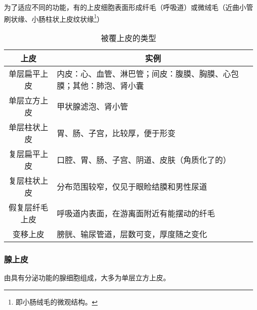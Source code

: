 为了适应不同的功能，有的上皮细胞表面形成纤毛（呼吸道）或微绒毛（近曲小管刷状缘、小肠柱状上皮纹状缘\footnote{即小肠绒毛的微观结构。}）

\begin{table}[h!]
	\centering
	\begin{tabularx}{\textwidth}{|c|X|}
		\hline
		上皮 & \multicolumn{1}{c|}{实例} \\ \hline
		单层扁平上皮 & 内皮：\hspace{-0.5em}心\hspace{-0.25em}、\hspace{-0.5em}血管\hspace{-0.25em}、\hspace{-0.5em}淋巴管；\hspace{-0.5em}间皮：\hspace{-0.5em}腹膜\hspace{-0.25em}、\hspace{-0.5em}胸膜\hspace{-0.25em}、\hspace{-0.5em}心包膜；\hspace{-0.5em}其他：\hspace{-0.5em}肺泡\hspace{-0.25em}、\hspace{-0.5em}肾小囊 \\ \hline
		单层立方上皮 & 甲状腺滤泡、肾小管 \\ \hline
		单层柱状上皮 & 胃、肠、子宫，比较厚，便于形变 \\ \hline
		复层扁平上皮 & 口腔、胃、肠、子宫、阴道、皮肤（角质化了的） \\ \hline
		复层柱状上皮 & 分布范围较窄，仅见于眼睑结膜和男性尿道 \\ \hline
		假复层纤毛上皮 & 呼吸道内表面，在游离面附近有能摆动的纤毛 \\ \hline
		变移上皮 & 膀胱、输尿管道，层数可变，厚度随之变化 \\ \hline
	\end{tabularx}
	\caption{被覆上皮的类型}
	\label{tab:CoveringEpithelium}
\end{table}

\subsubsection{腺上皮}

由具有分泌功能的腺细胞组成，大多为单层立方上皮。

